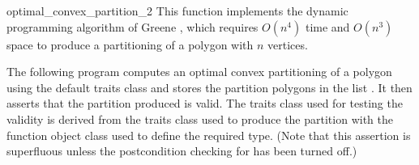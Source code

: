 \begin{ccRefFunction}{optimal_convex_partition_2}
\ccImplementation
This function implements the dynamic programming algorithm of Greene 
\cite{g-dpcp-83}, which requires $O(n^4)$ time and $O(n^3)$ space to
produce a partitioning of a polygon with $n$ vertices.  

\ccExample

The following program computes an optimal
convex partitioning of a polygon using the default
traits class and stores the partition polygons in the list 
.  
It then asserts that the partition produced is valid.  The
traits class used for testing the validity is derived from the
traits class used to produce the partition with the function object
class  used
to define the required  type. 
(Note that this assertion is superfluous unless the 
postcondition checking for  has been
turned off.)



\end{ccRefFunction}
